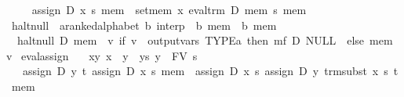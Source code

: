 \begin{isabellebody}
\ \ \isanewline
\ \ {}assign\ D\ x\ s\ mem\ {}\ set{}mem\ x\ {}eval{}trm\ D\ mem\ s{}\ mem{}\isanewline
\isanewline
{}\isamarkupfalse%
\ halt{}null\ {}{}\ {}{}{}a{}{}ranked{}alphabet{}\ {}b{}\ interp\ {}\ {}b\ mem\ {}\ {}b\ mem{}\isanewline
\ \ \isanewline
\ \ {}halt{}null\ D\ mem\ {}\ {}v{}\ if\ v\ {}\ output{}vars\ TYPE{}{}a{}\ then\ mf\ D\ NULL\ {}{}\ else\ mem\ v{}\isanewline
\isanewline
{}\isamarkupfalse%
\ eval{}assign{}{}\isanewline
\ \ \ xy{}\ {}x\ {}\ y{}\ \ ys{}\ {}y\ {}\ FV\ s{}\isanewline
\ \ \ {}assign\ D\ y\ t\ {}assign\ D\ x\ s\ mem{}\ {}\ assign\ D\ x\ s\ {}assign\ D\ y\ {}trm{}subst\ x\ s\ t{}\ mem{}{}\isanewline

\end{isabellebody}

